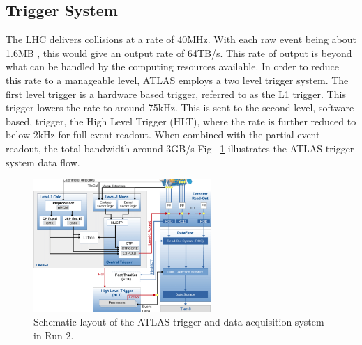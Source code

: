 \subsection{Trigger System}
The LHC delivers collisions at a rate of 40MHz. With each raw event being about 1.6MB \cite{Outreach:1457044}, this would give an output rate of 64TB/s. This rate of output is beyond what can be handled by the computing resources available. In order to reduce this rate to a manageable level, ATLAS employs a two level trigger system. The first level trigger is a hardware based trigger, referred to as the L1 trigger. This trigger lowers the rate to around 75kHz. This is sent to the second level, software based, trigger, the High Level Trigger (HLT), where the rate is further reduced to below 2kHz for full event readout. When combined with the partial event readout, the total bandwidth around 3GB/s Fig ~\ref{fig:TDAQ} illustrates the ATLAS trigger system data flow.\linebreak

\begin{figure}[h]
\begin{center}
\includegraphics*[width=0.60\textwidth] {figures/run2TDAQ}%
\caption[Schematic layout of the ATLAS trigger and data acquisition system in Run-2.]{Schematic layout of the ATLAS trigger and data acquisition system in Run-2.\cite{Ruiz-Martinez:2133909}}
\label{fig:TDAQ}
\end{center}
\end{figure}


